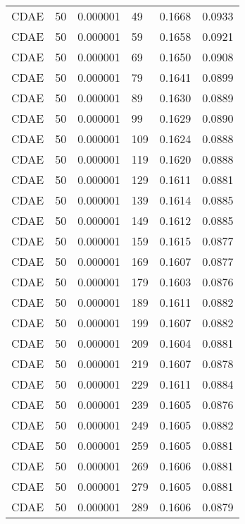 \begin{tabular}{llrlrr}
    CDAE &   50 &  0.000001 &    49 &  0.1668 &       0.0933 \\
    CDAE &   50 &  0.000001 &    59 &  0.1658 &       0.0921 \\
    CDAE &   50 &  0.000001 &    69 &  0.1650 &       0.0908 \\
    CDAE &   50 &  0.000001 &    79 &  0.1641 &       0.0899 \\
    CDAE &   50 &  0.000001 &    89 &  0.1630 &       0.0889 \\
    CDAE &   50 &  0.000001 &    99 &  0.1629 &       0.0890 \\
    CDAE &   50 &  0.000001 &   109 &  0.1624 &       0.0888 \\
    CDAE &   50 &  0.000001 &   119 &  0.1620 &       0.0888 \\
    CDAE &   50 &  0.000001 &   129 &  0.1611 &       0.0881 \\
    CDAE &   50 &  0.000001 &   139 &  0.1614 &       0.0885 \\
    CDAE &   50 &  0.000001 &   149 &  0.1612 &       0.0885 \\
    CDAE &   50 &  0.000001 &   159 &  0.1615 &       0.0877 \\
    CDAE &   50 &  0.000001 &   169 &  0.1607 &       0.0877 \\
    CDAE &   50 &  0.000001 &   179 &  0.1603 &       0.0876 \\
    CDAE &   50 &  0.000001 &   189 &  0.1611 &       0.0882 \\
    CDAE &   50 &  0.000001 &   199 &  0.1607 &       0.0882 \\
    CDAE &   50 &  0.000001 &   209 &  0.1604 &       0.0881 \\
    CDAE &   50 &  0.000001 &   219 &  0.1607 &       0.0878 \\
    CDAE &   50 &  0.000001 &   229 &  0.1611 &       0.0884 \\
    CDAE &   50 &  0.000001 &   239 &  0.1605 &       0.0876 \\
    CDAE &   50 &  0.000001 &   249 &  0.1605 &       0.0882 \\
    CDAE &   50 &  0.000001 &   259 &  0.1605 &       0.0881 \\
    CDAE &   50 &  0.000001 &   269 &  0.1606 &       0.0881 \\
    CDAE &   50 &  0.000001 &   279 &  0.1605 &       0.0881 \\
    CDAE &   50 &  0.000001 &   289 &  0.1606 &       0.0879 \\

\end{tabular}
